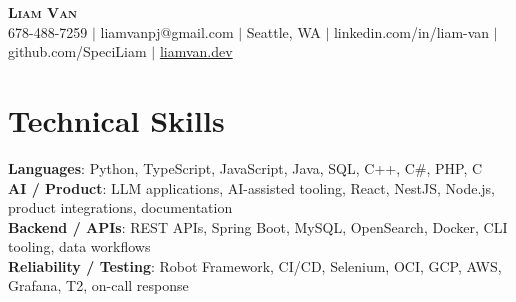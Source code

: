 \documentclass[letterpaper,11pt]{article}
\begin{document}

%
\begin{center}
    \textbf{\Huge \scshape Liam Van} \\ \vspace{1pt}
    \small 678-488-7259 $|$ \small {liamvanpj@gmail.com} $|$ Seattle, WA
 {{$|$ linkedin.com/in/liam-van} {$|$ github.com/SpeciLiam} {$|$ \href{https://liamvan.dev}{liamvan.dev}}}

\end{center}

\section{Technical Skills}
 \begin{itemize}[leftmargin=0.15in, label={}]
    \small{\item{
     \textbf{Languages}{: Python, TypeScript, JavaScript, Java, SQL, C++, C\#, PHP, C} \\
     \textbf{AI / Product}{: LLM applications, AI-assisted tooling, React, NestJS, Node.js, product integrations, documentation} \\
     \textbf{Backend / APIs}{: REST APIs, Spring Boot, MySQL, OpenSearch, Docker, CLI tooling, data workflows} \\
     \textbf{Reliability / Testing}{: Robot Framework, CI/CD, Selenium, OCI, GCP, AWS, Grafana, T2, on-call response} \\
    }}
 \end{itemize}
%

\end{document}

